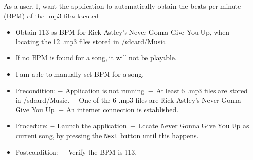 {As a user, I, want the application to automatically obtain the beats-per-minute (BPM) of the .mp3 files located.}
{\begin{itemize}
\item Obtain 113 as BPM for Rick Astley's Never Gonna Give You Up, when locating the 12 .mp3 files stored in /sdcard/Music.
\item If no BPM is found for a song, it will not be playable.
\item I am able to manually set BPM for a song.
\end{itemize}}
{\begin{itemize}
\item Precondition: 
\subitem $-$ Application is not running.
\subitem $-$ At least 6 .mp3 files are stored in /sdcard/Music.
\subitem $-$ One of the 6 .mp3 files are Rick Astley's Never Gonna Give You Up.
\subitem $-$ An internet connection is established.

\item Procedure:
\subitem $-$ Launch the application.
\subitem $-$ Locate Never Gonna Give You Up as current song, by pressing the \texttt{Next} button until this happens.

\item Postcondition:
\subitem $-$ Verify the BPM is 113.
\end{itemize}}


